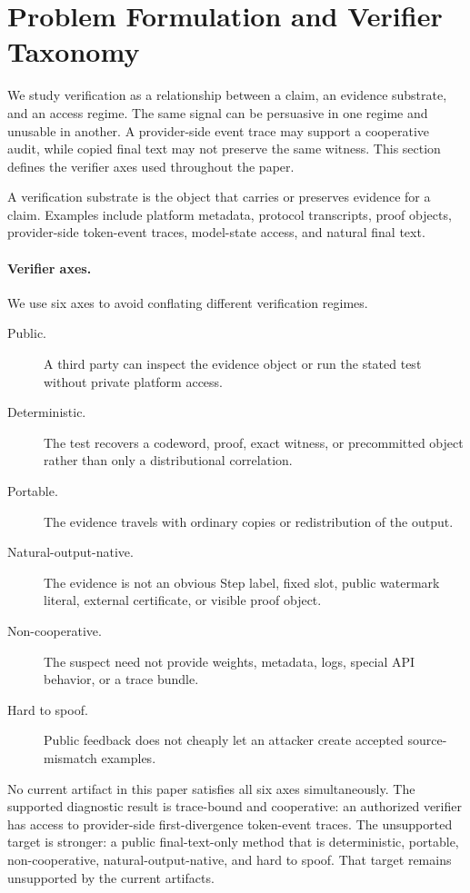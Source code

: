 \section{Problem Formulation and Verifier Taxonomy}
\label{sec:setup}

We study verification as a relationship between a claim, an evidence substrate,
and an access regime.  The same signal can be persuasive in one regime and
unusable in another.  A provider-side event trace may support a cooperative
audit, while copied final text may not preserve the same witness.  This section
defines the verifier axes used throughout the paper.

\begin{definition}
A verification substrate is the object that carries or preserves evidence for a
claim.  Examples include platform metadata, protocol transcripts, proof
objects, provider-side token-event traces, model-state access, and natural
final text.
\end{definition}

\paragraph{Verifier axes.}
We use six axes to avoid conflating different verification regimes.
\begin{description}
\item[Public.] A third party can inspect the evidence object or run the stated
test without private platform access.
\item[Deterministic.] The test recovers a codeword, proof, exact witness, or
precommitted object rather than only a distributional correlation.
\item[Portable.] The evidence travels with ordinary copies or redistribution of
the output.
\item[Natural-output-native.] The evidence is not an obvious Step label, fixed
slot, public watermark literal, external certificate, or visible proof object.
\item[Non-cooperative.] The suspect need not provide weights, metadata, logs,
special API behavior, or a trace bundle.
\item[Hard to spoof.] Public feedback does not cheaply let an attacker create
accepted source-mismatch examples.
\end{description}

No current artifact in this paper satisfies all six axes simultaneously.  The
supported diagnostic result is trace-bound and cooperative: an authorized
verifier has access to provider-side first-divergence token-event traces.  The
unsupported target is stronger: a public final-text-only method that is
deterministic, portable, non-cooperative, natural-output-native, and hard to
spoof.  That target remains unsupported by the current artifacts.

